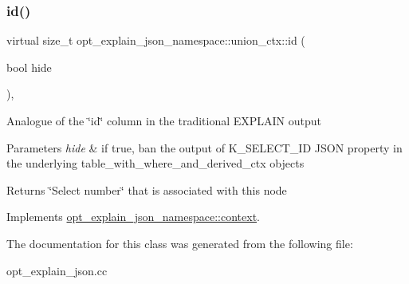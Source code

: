 \mbox{\label{classopt__explain__json__namespace_1_1union__ctx_a12834a26065cdae8c5b5c39d91ecdcec}} 
\subsubsection{\texorpdfstring{id()}{id()}}
{\footnotesize\ttfamily virtual size\+\_\+t opt\+\_\+explain\+\_\+json\+\_\+namespace\+::union\+\_\+ctx\+::id (\begin{DoxyParamCaption}\item[{bool}]{hide }\end{DoxyParamCaption})\hspace{0.3cm}{\ttfamily [inline]}, {\ttfamily [virtual]}}

Analogue of the \char`\"{}id\char`\"{} column in the traditional E\+X\+P\+L\+A\+IN output


\begin{DoxyParams}{Parameters}
{\em hide} & if true, ban the output of K\+\_\+\+S\+E\+L\+E\+C\+T\+\_\+\+ID J\+S\+ON property in the underlying table\+\_\+with\+\_\+where\+\_\+and\+\_\+derived\+\_\+ctx objects\\
\hline
\end{DoxyParams}
\begin{DoxyReturn}{Returns}
\char`\"{}\+Select number\char`\"{} that is associated with this node 
\end{DoxyReturn}


Implements \mbox{\hyperlink{classopt__explain__json__namespace_1_1context_a07c46bab31a35d88c13ccdca82755aaa}{opt\+\_\+explain\+\_\+json\+\_\+namespace\+::context}}.



The documentation for this class was generated from the following file\+:\begin{DoxyCompactItemize}
\item 
opt\+\_\+explain\+\_\+json.\+cc\end{DoxyCompactItemize}
